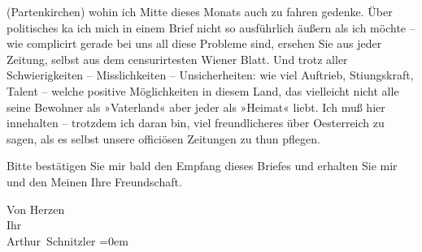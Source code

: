                   (Partenkirchen) wohin ich Mitte dieses Monats
               auch zu fahren gedenke. Über politisches ka{\geminationn} ich mich in
               einem Brief nicht so ausführlich äußern als ich möchte – wie complicirt gerade bei
               uns all diese Probleme sind, ersehen Sie aus jeder Zeitung, selbst aus dem
               censurirtesten Wiener Blatt. Und trotz aller
               Schwierigkeiten – Misslichkeiten – Unsicherheiten: wie viel Auftrieb, Sti{\geminationm}ungskraft, Talent – welche positive Möglichkeiten in
               diesem Land, das vielleicht
               nicht {\pb}alle seine Bewohner als »Vaterland« aber
               jeder als »Heimat« liebt. Ich muß hier innehalten – trotzdem ich daran bin, viel
               freundlicheres über Oesterreich zu sagen, als
               es \introOben{}selbst\introOben{} unsere officiösen Zeitungen zu thun pflegen.\pend
           
\pstart
           Bitte bestätigen Sie mir bald den Empfang dieses Briefes und erhalten Sie mir und den
               Meinen Ihre Freundschaft.\pend
           
\pstart
           Von Herzen{\\[\baselineskip]}Ihr{\\[\baselineskip]}\spacefill\mbox{Arthur Schnitzler}\pend
           \leftskip=0em{}\endnumbering{}  \newcommand{\dateiname}{L02292}\newcommand{\titel}{Arthur Schnitzler an Georg Brandes, 2. 8. 1918}\newcommand{\editorInnen}{Martin Anton Müller und Gerd-Hermann Susen}
